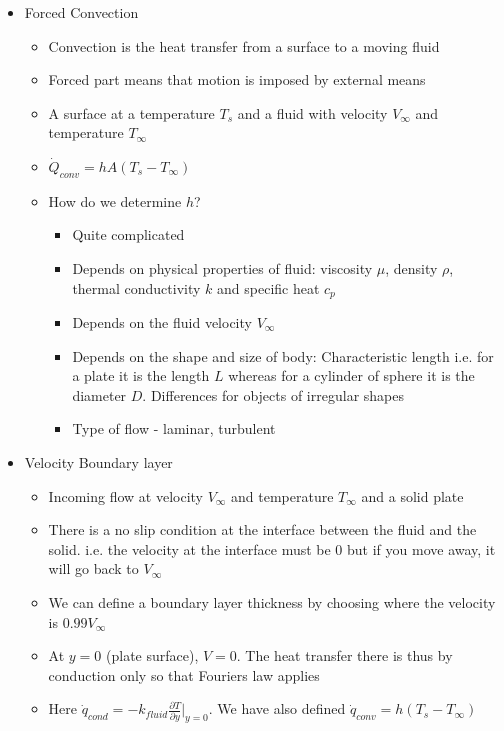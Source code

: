 \documentclass[12pt]{article}
\begin{document}
\begin{itemize}
    \item Forced Convection \begin{itemize}
        \item Convection is the heat transfer from a surface to a moving fluid
        \item Forced part means that motion is imposed by external means
        \item A surface at a temperature $T_s$ and a fluid with velocity $V_{\infty}$ and temperature $T_{\infty}$
        \item $\dot{Q}_{conv} = hA(T_s - T_{\infty})$
        \item How do we determine $h$? \begin{itemize}
            \item Quite complicated
            \item Depends on physical properties of fluid: viscosity $\mu$, density $\rho$, thermal conductivity $k$ and specific heat $c_p$
            \item Depends on the fluid velocity $V_{\infty}$
            \item Depends on the shape and size of body: Characteristic length i.e. for a plate it is the length $L$ whereas for a cylinder of sphere it is the diameter $D$. Differences for objects of irregular shapes
            \item Type of flow - laminar, turbulent
        \end{itemize}
    \end{itemize}
    \item Velocity Boundary layer \begin{itemize}
        \item Incoming flow at velocity $V_{\infty}$ and temperature $T_{\infty}$ and a solid plate
        \item There is a no slip condition at the interface between the fluid and the solid. i.e. the velocity at the interface must be 0 but if you move away, it will go back to $V_{\infty}$
        \item We can define a boundary layer thickness by choosing where the velocity is $0.99 V_{\infty}$
        \item At $y = 0$ (plate surface), $V = 0$. The heat transfer there is thus by conduction only so that Fouriers law applies
        \item Here $\dot{q}_{cond} = -k_{fluid} \frac{\partial T}{\partial y} |_{y= 0}$. We have also defined $\dot{q}_{conv} = h (T_s - T_{\infty})$

\end{itemize}
\end{itemize}
\end{document}
